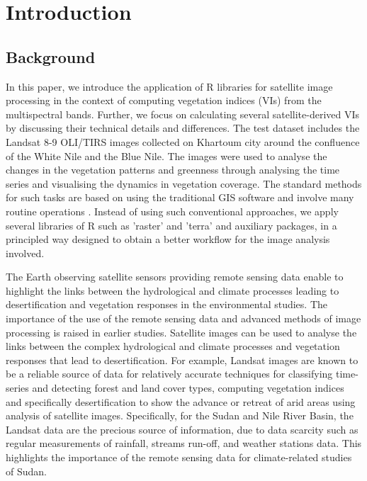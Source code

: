 \documentclass[jimaging,article,submit,pdftex,moreauthors]{Definitions/mdpi}
\begin{document}
\section{Introduction}

\subsection{Background}

In this paper, we introduce the application of R libraries for satellite image processing in the context of computing vegetation indices (VIs) from the multispectral bands. Further, we focus on calculating several satellite-derived VIs by discussing their technical details and differences. The test dataset includes the Landsat 8-9 OLI/TIRS images collected on Khartoum city around the confluence of the White Nile and the Blue Nile. The images were used to analyse the changes in the vegetation patterns and greenness through analysing the time series and visualising the dynamics in vegetation coverage. The standard methods for such tasks are based on using the traditional GIS software \cite{AHMED201829} and involve many routine operations \cite{Hawash,YOUSSEF2020103777,6621869,Aldoma}. Instead of using such conventional approaches, we apply several libraries of R such as 'raster' and 'terra' and auxiliary packages, in a principled way designed to obtain a better workflow for the image analysis involved.

The Earth observing satellite sensors providing remote sensing data enable to highlight the links between the hydrological and climate processes leading to desertification and vegetation responses in the environmental studies. The importance of the use of the remote sensing data and advanced methods of image processing is raised in earlier studies\cite{su14137871,ELBASTAWESY2017252,SOSNOWSKI201651,GORSEVSKI201364}. Satellite images can be used to analyse the links between the complex hydrological and climate processes and vegetation responses that lead to desertification. For example, Landsat images are known to be a reliable source of data for relatively accurate techniques for classifying time-series and detecting forest and land cover types\cite{WILSON2002385,Lemenkova202227,4293065,SALIH2017S21}, computing vegetation indices \cite{5416935,Lemenkova202229,1026428} and specifically desertification \cite{RIVERAMARIN2022104829} to show the advance or retreat of arid areas using analysis of satellite images. Specifically, for the Sudan and Nile River Basin, the Landsat data are the precious source of information, due to data scarcity \cite{Ali} such as regular measurements of rainfall, streams run-off, and  weather stations data. This highlights the importance of the remote sensing data for climate-related studies of Sudan.
\end{document}
